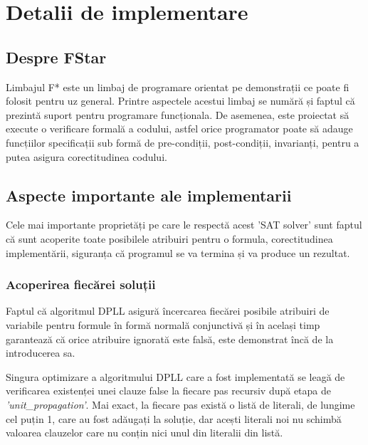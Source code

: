 \chapter{Detalii de implementare}


\section{Despre FStar}

Limbajul F* este un limbaj de programare orientat pe demonstrații ce poate fi \newline folosit pentru uz general. Printre aspectele acestui limbaj se numără și faptul că \newline prezintă suport pentru programare funcționala. De asemenea, este proiectat să execute o verificare formală a codului, astfel orice programator poate să adauge funcțiilor \newline specificații sub formă de pre-condiții, post-condiții, invarianți, pentru a putea asigura corectitudinea codului.

\section{Aspecte importante ale implementarii}

Cele mai importante proprietăți pe care le respectă acest 'SAT solver' sunt \newline faptul că sunt acoperite toate posibilele atribuiri pentru o formula, corectitudinea implementării, siguranța că programul se va termina și va produce un rezultat.

\subsection{Acoperirea fiecărei soluții}

Faptul că algoritmul DPLL asigură încercarea fiecărei posibile atribuiri de variabile pentru formule în formă normală conjunctivă și în același timp garantează că orice atribuire ignorată este falsă, este demonstrat încă de la introducerea sa.

Singura optimizare a algoritmului DPLL care a fost implementată se leagă de \newline verificarea existenței unei clauze false la fiecare pas recursiv după etapa de \textit{'unit\_propagation'}. \newpage Mai exact, la fiecare pas există o listă de literali, de lungime cel puțin 1, care au fost \newline adăugați la soluție, dar acești literali noi nu schimbă valoarea clauzelor care nu conțin nici unul din literalii din listă.
 
